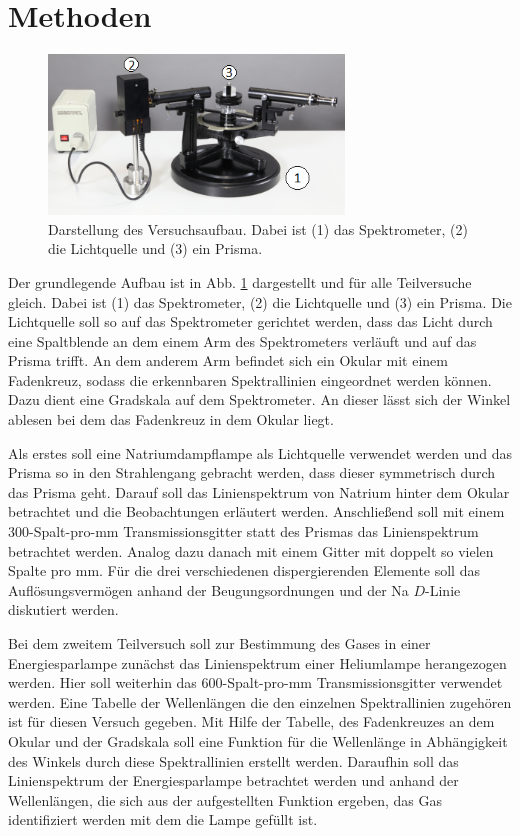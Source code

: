 \section{Methoden} \label{sec:Methoden}
			
	\begin{figure}[ht]
		\centering
		\includegraphics[width=0.7\textwidth]{bilder/aufbau.png}
		\caption{Darstellung des Versuchsaufbau. Dabei ist (1) das Spektrometer, (2) die Lichtquelle und (3) ein Prisma.\cite{WWU}}
		\label{fig:aufbau}	
	\end{figure}	
	Der grundlegende Aufbau ist in Abb. \ref{fig:aufbau} dargestellt und für alle Teilversuche gleich.
	Dabei ist (1) das Spektrometer, (2) die Lichtquelle und (3) ein Prisma.
	Die Lichtquelle soll so auf das Spektrometer gerichtet werden, dass das Licht durch eine Spaltblende an dem einem Arm des Spektrometers verläuft und auf das Prisma trifft.
	An dem anderem Arm befindet sich ein Okular mit einem Fadenkreuz, sodass die erkennbaren Spektrallinien eingeordnet werden können.
	Dazu dient eine Gradskala auf dem Spektrometer.
	An dieser lässt sich der Winkel ablesen bei dem das Fadenkreuz in dem Okular liegt.
	
	Als erstes soll eine Natriumdampflampe als Lichtquelle verwendet werden und das Prisma so in den Strahlengang gebracht werden, dass dieser symmetrisch durch das Prisma geht.
	Darauf soll das Linienspektrum von Natrium hinter dem Okular betrachtet und die Beobachtungen erläutert werden.
	Anschließend soll mit einem 300-Spalt-pro-\si{\milli\meter} Transmissionsgitter statt des Prismas das Linienspektrum betrachtet werden.
	Analog dazu danach mit einem Gitter mit doppelt so vielen Spalte pro \si{\milli\meter}.
	Für die drei verschiedenen dispergierenden Elemente soll das Auflösungsvermögen anhand der Beugungsordnungen und der Na $D$-Linie diskutiert werden.
	
	Bei dem zweitem Teilversuch soll zur Bestimmung des Gases in einer Energiesparlampe zunächst das Linienspektrum einer Heliumlampe herangezogen werden.
	Hier soll weiterhin das 600-Spalt-pro-\si{\milli\meter} Transmissionsgitter verwendet werden.
	Eine Tabelle der Wellenlängen die den einzelnen Spektrallinien zugehören ist für diesen Versuch gegeben.
	Mit Hilfe der Tabelle, des Fadenkreuzes an dem Okular und der Gradskala soll eine Funktion für die Wellenlänge in Abhängigkeit des Winkels durch diese Spektrallinien erstellt werden.
	Daraufhin soll das Linienspektrum der Energiesparlampe betrachtet werden und anhand der Wellenlängen, die sich aus der aufgestellten Funktion ergeben, das Gas identifiziert werden mit dem die Lampe gefüllt ist.
	
